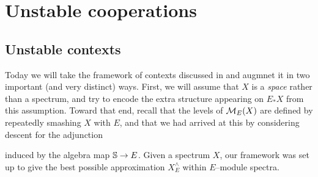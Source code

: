 
\chapter{Unstable cooperations}





\section{Unstable contexts}

Today we will take the framework of contexts discussed in  and augmnet it in two important (and very distinct) ways.  First, we will assume that $X$ is a \emph{space} rather than a spectrum, and try to encode the extra structure appearing on $E_* X$ from this assumption.  Toward that end, recall that the levels of $\context{E}(X)$ are defined by repeatedly smashing $X$ with $E$, and that we had arrived at this by considering descent for the adjunction
\begin{center}
\end{center}
induced by the algebra map $\S \to E$.  Given a spectrum $X$, our framework was set up to give the best possible approximation $X^\wedge_E$ within $E$--module spectra.


